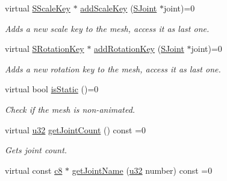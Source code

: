 \begin{DoxyCompactItemize}
\mbox{\label{classirr_1_1scene_1_1ISkinnedMesh_a3601a01c99594fe8db3cccaec89df7d6}} 
virtual \hyperlink{structirr_1_1scene_1_1ISkinnedMesh_1_1SScaleKey}{S\+Scale\+Key} $\ast$ \hyperlink{classirr_1_1scene_1_1ISkinnedMesh_a3601a01c99594fe8db3cccaec89df7d6}{add\+Scale\+Key} (\hyperlink{structirr_1_1scene_1_1ISkinnedMesh_1_1SJoint}{S\+Joint} $\ast$joint)=0
\begin{DoxyCompactList}\small\item\em Adds a new scale key to the mesh, access it as last one. \end{DoxyCompactList}\item 
\mbox{\label{classirr_1_1scene_1_1ISkinnedMesh_ab5d41c1fc22de5d7cb9c376d2a873ab9}} 
virtual \hyperlink{structirr_1_1scene_1_1ISkinnedMesh_1_1SRotationKey}{S\+Rotation\+Key} $\ast$ \hyperlink{classirr_1_1scene_1_1ISkinnedMesh_ab5d41c1fc22de5d7cb9c376d2a873ab9}{add\+Rotation\+Key} (\hyperlink{structirr_1_1scene_1_1ISkinnedMesh_1_1SJoint}{S\+Joint} $\ast$joint)=0
\begin{DoxyCompactList}\small\item\em Adds a new rotation key to the mesh, access it as last one. \end{DoxyCompactList}\item 
\mbox{\label{classirr_1_1scene_1_1ISkinnedMesh_a2131a8693a84e29036ffff69955a2ec1}} 
virtual bool \hyperlink{classirr_1_1scene_1_1ISkinnedMesh_a2131a8693a84e29036ffff69955a2ec1}{is\+Static} ()=0
\begin{DoxyCompactList}\small\item\em Check if the mesh is non-\/animated. \end{DoxyCompactList}\item 
virtual \hyperlink{namespaceirr_a0416a53257075833e7002efd0a18e804}{u32} \hyperlink{classirr_1_1scene_1_1ISkinnedMesh_a7715fb82ffec225d2fd9b8aa860e3c38}{get\+Joint\+Count} () const =0
\begin{DoxyCompactList}\small\item\em Gets joint count. \end{DoxyCompactList}\item 
virtual const \hyperlink{namespaceirr_a9395eaea339bcb546b319e9c96bf7410}{c8} $\ast$ \hyperlink{classirr_1_1scene_1_1ISkinnedMesh_ab28aed78a7e2eeaa20ba7eb0eb082ba4}{get\+Joint\+Name} (\hyperlink{namespaceirr_a0416a53257075833e7002efd0a18e804}{u32} number) const =0

\end{DoxyCompactItemize}
